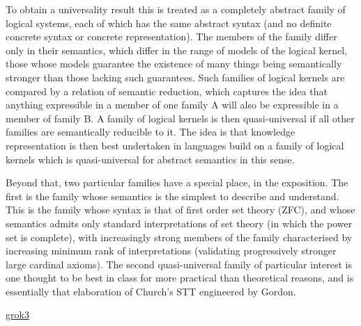 \documentclass[10pt,titlepage]{book}
\begin{document}
To obtain a universality result this is treated as a completely abstract family of logical systems, each of which has the same abstract syntax (and no definite concrete syntax or concrete representation).
The members of the family differ only in their semantics,  which differ in the range of models of the logical kernel,
those whose models guarantee the existence of many things being semantically stronger than those lacking such guarantees.
Such families of logical kernels are compared by a relation of semantic reduction, which captures the idea that anything expressible in a member of one family A will also be expressible in a member of family B.
A family of logical kernels is then quasi-universal if all other families are semantically reducible to it.
The idea is that knowledge representation is then best undertaken in languages build on a family of logical kernels which is quasi-universal for abstract semantics in this sense.

Beyond that, two particular families have a special place, in the exposition.
The first is the family whose semantics is the simplest to describe and understand.
This is the family whose syntax is that of first order set theory (ZFC), and whose semantics admits only standard interpretations of set theory (in which the power set is complete), with increasingly strong members of the family characterised by increasing minimum rank of interpretations (validating progressively stronger large cardinal axioms).
The second quasi-universal family of particular interest is one thought to be best in class for more practical than theoretical reasons, and is essentially that elaboration of Church's STT engineered by Gordon.

\href{https://x.com/i/grok/share/iacVw0BpdDpRgU9PPQZaV6KjN}{grok3}

\cite{carnap63a,carnap63}
\listoftables




\renewcommand{\indexname}{Index of Defined Terms}
{\twocolumn[]
{\small\printindex}}


\end{document}
